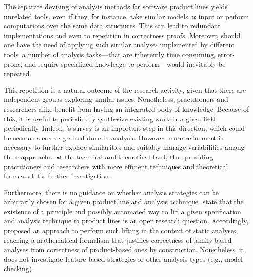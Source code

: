 %
%



The separate devising of analysis methods for software product lines yields
unrelated tools, even if they, for instance, take similar models as input or perform
computations over the same data structures. This can lead to redundant
implementations and even to repetition in correctness proofs.
Moreover, should one have the need of applying such similar analyses
implemented by different tools, a number of analysis tasks---that are
inherently time consuming, error-prone, and require specialized knowledge to perform---would
inevitably be repeated.

This repetition is a natural outcome of the research activity, given that
there are independent groups exploring similar issues. Nonetheless,
practitioners and researchers alike benefit from having an integrated
body of knowledge. Because of this, it is useful to periodically synthesize
existing work in a given field periodically.
Indeed, \citeauthor{Thum2014}'s survey \citep{Thum2014} is an important step
in this direction, which could be seen as a coarse-grained domain analysis.
However, more refinement is necessary to further explore similarities and
suitably manage variabilities among these approaches at the technical and theoretical level, thus providing
practitioners and researchers with more efficient techniques and theoretical framework for further investigation.

Furthermore, there is no guidance on whether analysis strategies can be
arbitrarily chosen for a given product line and analysis technique.
\cite{Thum2014} state that the existence of a principle and possibly
automated way to lift a given specification and analysis technique to product
lines is an open research question. Accordingly, \cite{Midtgaard2015} proposed
an approach to perform such lifting in the context of static analyses,
reaching a mathematical formalism that justifies correctness of family-based
analyses from correctness of product-based ones by construction. Nonetheless,
it does not investigate feature-based strategies or other analysis types (e.g.,
model checking).


